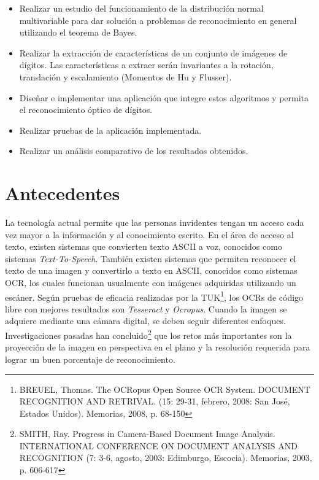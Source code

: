 \documentclass[a4paper, 11pt, oneside]{report}
\begin{document}
	\begin{itemize}
	
	\item Realizar un estudio del funcionamiento de la distribución normal multivariable para dar solución a problemas de reconocimiento en general utilizando el teorema de Bayes.

	\item Realizar la extracción de características de un conjunto de imágenes de dígitos. Las características a extraer serán invariantes a la rotación, translación y escalamiento (Momentos de Hu y Flusser).
	
	\item Diseñar e implementar una aplicación que integre estos algoritmos y permita el reconocimiento óptico de dígitos.
	
	\item Realizar pruebas de la aplicación implementada.
	
	\item Realizar un análisis comparativo de los resultados obtenidos.

	\end{itemize}
	
\section {Antecedentes}

La tecnología actual permite que las personas invidentes tengan un acceso cada vez mayor a la información y al conocimiento escrito. En el área de acceso al texto, existen sistemas que convierten texto ASCII a voz, conocidos como sistemas \textit{Text-To-Speech}. También existen sistemas que permiten reconocer el texto de una imagen y convertirlo a texto en ASCII, conocidos como sistemas OCR, los cuales funcionan usualmente con imágenes adquiridas utilizando un escáner. Según pruebas de eficacia realizadas por la TUK\footnote{BREUEL, Thomas. The OCRopus Open Source OCR System. DOCUMENT RECOGNITION AND RETRIVAL. (15: 29-31, febrero, 2008: San José, Estados Unidos). Memorias, 2008, p. 68-150}, los OCRs de código libre con mejores resultados son \textit{Tesseract} y \textit{Ocropus}. Cuando la imagen se adquiere mediante una cámara digital, se deben seguir diferentes enfoques. Investigaciones pasadas han concluido\footnote{SMITH, Ray. Progress in Camera-Based Document Image Analysis. INTERNATIONAL CONFERENCE ON DOCUMENT ANALYSIS AND RECOGNITION (7: 3-6, agosto, 2003: Edimburgo, Escocia). Memorias, 2003, p. 606-617} que los retos más importantes son la proyección de la imagen en perspectiva en el plano y la resolución requerida para lograr un buen porcentaje de reconocimiento.
\end{document}
